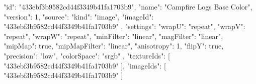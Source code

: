{
  "id": "433ebf3b9582cd44f3349b41fa1703b9",
  "name": "Campfire Logs Base Color",
  "version": 1,
  "source": {
    "kind": "image",
    "imageId": "433ebf3b9582cd44f3349b41fa1703b9"
  },
  "settings": {
    "wrapU": "repeat",
    "wrapV": "repeat",
    "wrapW": "repeat",
    "minFilter": "linear",
    "magFilter": "linear",
    "mipMap": true,
    "mipMapFilter": "linear",
    "anisotropy": 1,
    "flipY": true,
    "precision": "low",
    "colorSpace": "srgb"
  },
  "textureIds": [
    "433ebf3b9582cd44f3349b41fa1703b9"
  ],
  "imageIds": [
    "433ebf3b9582cd44f3349b41fa1703b9"
  ]
}
